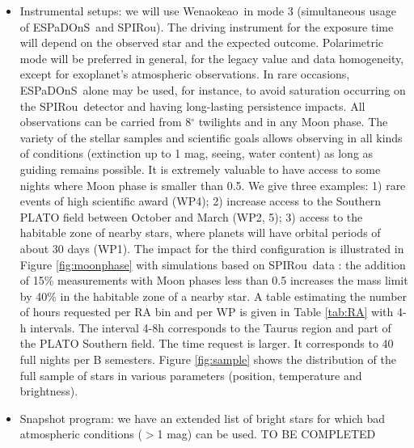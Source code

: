 \documentclass[
    traditabstract,
    longauth,
    onecolumn,
]{aa}
\def \spi{SPIRou}
\def \esp{ESPaDOnS}
\def \wena{Wenaokeao}
\begin{document}
\begin{itemize}
    \item 
Instrumental setups: we will use \wena\ in mode 3 (simultaneous usage of \esp\ and \spi). The driving instrument for the exposure time will depend on the observed star and the expected outcome. Polarimetric mode will be preferred in general, for the legacy value and data homogeneity, except for exoplanet’s atmospheric observations. In rare occasions, \esp\ alone may be used, for instance, to avoid saturation occurring on the \spi\ detector and having long-lasting persistence impacts.
All observations can be carried from 8$^\circ$ twilights and in any Moon phase. The variety of the stellar samples and scientific goals allows observing in all kinds of conditions (extinction up to 1 mag, seeing, water content) as long as guiding remains possible. It is extremely valuable to have access to some nights where Moon phase is smaller than 0.5. We give three examples: 1) rare events of high scientific award (WP4); 2) increase access to the Southern PLATO field between October and March (WP2, 5); 3) access to the habitable zone of nearby stars, where planets will have orbital periods of about 30 days (WP1). The impact for the third configuration is illustrated in Figure \ref{fig:moonphase} with simulations based on \spi\ data \citep{charpentier2026}: the addition of 15\% measurements with Moon phases less than 0.5 increases the mass limit by 40\% in the habitable zone of a nearby star.
A table estimating the number of hours requested per RA bin and per WP is given in Table \ref{tab:RA} with 4-h intervals. The interval 4-8h corresponds to the Taurus region and part of the PLATO Southern field. The time request is larger. It corresponds to 40 full nights per B semesters. Figure \ref{fig:sample} shows the distribution of the full sample of stars in various parameters (position, temperature and brightness).
    \item 
Snapshot program: we have an extended list of bright stars for which bad atmospheric conditions ($>$1 mag) can be used. TO BE COMPLETED

\end{itemize}
\end{document}
